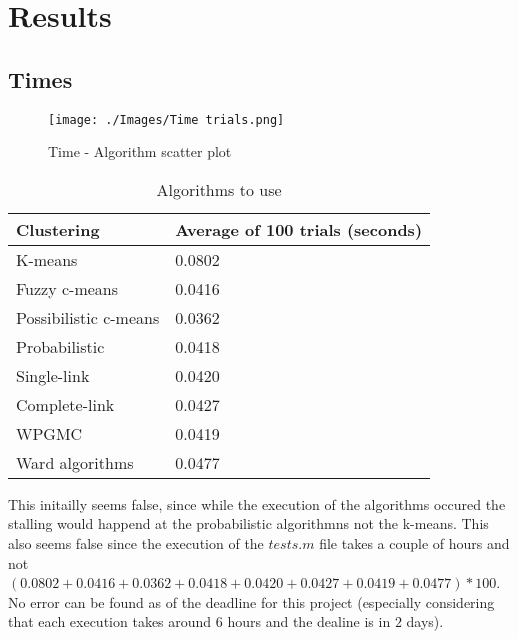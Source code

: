 \documentclass[12pt, a4paper]{article}
\begin{document}
\section{Results}

\subsection{Times}

\begin{figure}[H]
    \begin{center}
        \texttt{[image: ./Images/Time trials.png]}
    \end{center}
    \caption{Time - Algorithm scatter plot}\label{fig:Times}
\end{figure}

\begin{table}[H]
    \caption{Algorithms to use}\label{tab:Times}
    \begin{center}
        \begin{tabular}{l|l}
            \hline
            \textbf{Clustering} & \textbf{Average of 100 trials (seconds)} \\
            \hline
                K-means & 0.0802 \\
                Fuzzy c-means & 0.0416 \\
                Possibilistic c-means & 0.0362 \\
                Probabilistic & 0.0418 \\
                Single-link & 0.0420 \\
                Complete-link & 0.0427 \\
                WPGMC & 0.0419 \\
                Ward algorithms & 0.0477 \\
            \hline
        \end{tabular}
    \end{center}
\end{table}

This initailly seems false, since while the execution of the algorithms occured the stalling would happend at the probabilistic algorithmns not the k-means. This also seems false since the execution of the $tests.m$ file takes a couple of hours and not $(0.0802 + 0.0416 + 0.0362 + 0.0418 + 0.0420 + 0.0427 + 0.0419 + 0.0477) * 100$. No error can be found as of the deadline for this project (especially considering that each execution takes around $6$ hours and the dealine is in $2$ days).
\newline
\end{document}
